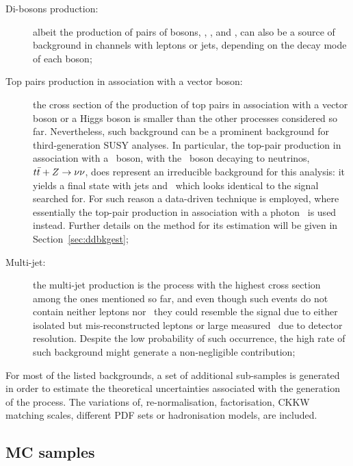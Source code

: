 \begin{description}
			\item [Di-bosons production:] albeit the production of pairs of bosons, \Wboson\Wboson, \Wboson\Zboson, and \Zboson\Zboson, can also be a source of background in channels with leptons or jets, depending on the decay mode of each boson;

			\item [Top pairs production in association with a vector boson:] the cross section of the production of top pairs in association with a vector boson or a Higgs boson is smaller than the other processes considered so far. Nevertheless, such background can be a prominent background for third-generation \ac{SUSY} analyses. In particular, the top-pair production in association with a \Zboson\ boson, with the \Zboson\ boson decaying to neutrinos, $t\bar{t}+Z \rightarrow \nu \nu$, does represent an irreducible background for this analysis: it yields a final state with jets and \met\ which looks identical to the signal searched for. For such reason a data-driven technique is employed, where essentially the top-pair production in association with a photon \ttgamma\ is used instead. Further details on the method for its estimation will be given in Section~\ref{sec:ddbkgest}; 

			\item [Multi-jet:] the multi-jet production is the process with the highest cross section among the ones mentioned so far, and even though such events do not contain neither leptons nor \met\ they could resemble the signal due to either isolated but mis-reconstructed leptons or large measured \met\ due to detector resolution. Despite the low probability of such occurrence, the high rate of such background might generate a non-negligible contribution;
		\end{description}

		\noindent For most of the listed backgrounds, a set of additional sub-samples is generated in order to estimate the theoretical uncertainties associated with the generation of the process. The variations of, re-normalisation, factorisation, \ac{CKKW} matching scales, different \ac{PDF} sets or hadronisation models, are included.

		\subsection{MC samples}
		\label{subsec:mc_samples}

